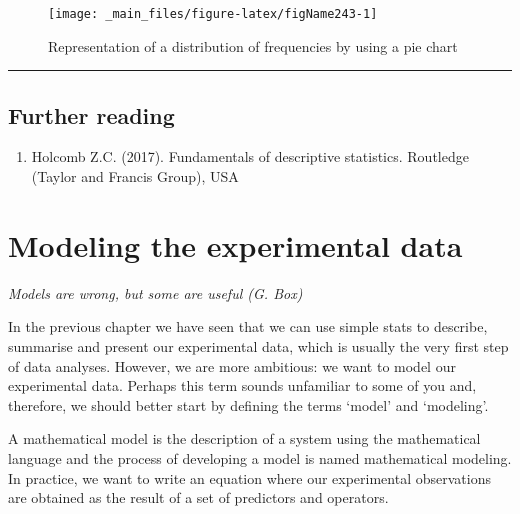 \documentclass[a4paper,12pt,oneside]{book}
\providecommand{\tightlist}{%
  \setlength{\itemsep}{0pt}\setlength{\parskip}{0pt}}
\newenvironment{Shaded}{\begin{snugshade}}{\end{snugshade}}
\newcommand{\SpecialCharTok}[1]{#1}
\newcommand{\FunctionTok}[1]{#1}
\newcommand{\NormalTok}[1]{#1}
\begin{document}
\begin{Shaded}
\end{Shaded}

\begin{figure}

{\centering \texttt{[image: \_main\_files/figure-latex/figName243-1]} 

}

\caption{Representation of a distribution of frequencies by using a pie chart}\label{fig:figName243}
\end{figure}

\begin{center}\rule{0.5\linewidth}{0.5pt}\end{center}

\hypertarget{further-reading}{%
\section{Further reading}\label{further-reading}}

\begin{enumerate}
\def\labelenumi{\arabic{enumi}.}
\tightlist
\item
  Holcomb Z.C. (2017). Fundamentals of descriptive statistics. Routledge (Taylor and Francis Group), USA
\end{enumerate}

\hypertarget{modeling-the-experimental-data}{%
\chapter{Modeling the experimental data}\label{modeling-the-experimental-data}}

\emph{Models are wrong, but some are useful (G. Box)}

In the previous chapter we have seen that we can use simple stats to describe, summarise and present our experimental data, which is usually the very first step of data analyses. However, we are more ambitious: we want to model our experimental data. Perhaps this term sounds unfamiliar to some of you and, therefore, we should better start by defining the terms `model' and `modeling'.

A mathematical model is the description of a system using the mathematical language and the process of developing a model is named mathematical modeling. In practice, we want to write an equation where our experimental observations are obtained as the result of a set of predictors and operators.
\end{document}
